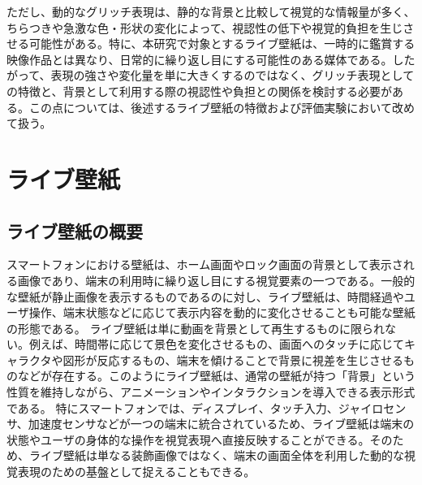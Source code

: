 ただし、動的なグリッチ表現は、静的な背景と比較して視覚的な情報量が多く、ちらつきや急激な色・形状の変化によって、視認性の低下や視覚的負担を生じさせる可能性がある。特に、本研究で対象とするライブ壁紙は、一時的に鑑賞する映像作品とは異なり、日常的に繰り返し目にする可能性のある媒体である。したがって、表現の強さや変化量を単に大きくするのではなく、グリッチ表現としての特徴と、背景として利用する際の視認性や負担との関係を検討する必要がある。この点については、後述するライブ壁紙の特徴および評価実験において改めて扱う。




\section{ライブ壁紙}
\subsection{ライブ壁紙の概要}
スマートフォンにおける壁紙は、ホーム画面やロック画面の背景として表示される画像であり、端末の利用時に繰り返し目にする視覚要素の一つである。一般的な壁紙が静止画像を表示するものであるのに対し、ライブ壁紙は、時間経過やユーザ操作、端末状態などに応じて表示内容を動的に変化させることも可能な壁紙の形態である。
ライブ壁紙は単に動画を背景として再生するものに限られない。例えば、時間帯に応じて景色を変化させるもの、画面へのタッチに応じてキャラクタや図形が反応するもの、端末を傾けることで背景に視差を生じさせるものなどが存在する。このようにライブ壁紙は、通常の壁紙が持つ「背景」という性質を維持しながら、アニメーションやインタラクションを導入できる表示形式である。
特にスマートフォンでは、ディスプレイ、タッチ入力、ジャイロセンサ、加速度センサなどが一つの端末に統合されているため、ライブ壁紙は端末の状態やユーザの身体的な操作を視覚表現へ直接反映することができる。そのため、ライブ壁紙は単なる装飾画像ではなく、端末の画面全体を利用した動的な視覚表現のための基盤として捉えることもできる。
